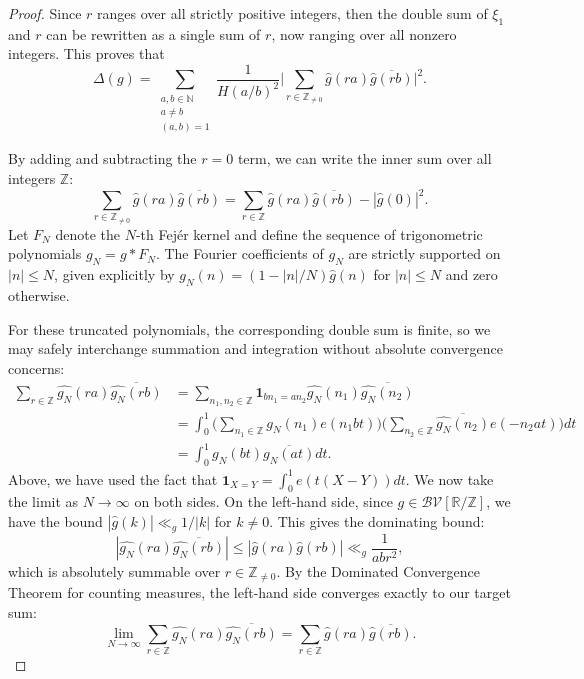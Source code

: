\documentclass[12pt]{amsart}
\renewcommand{\le}{\leqslant}
\numberwithin{equation}{section}
\theoremstyle{plain}
\theoremstyle{definition}
\newcommand{\N}{\mathbb{N}}
\newcommand{\Z}{\mathbb{Z}}
\newcommand{\R}{\mathbb{R}}
\newcommand{\CB}{\mathcal{B}}
\newcommand{\CV}{\mathcal{V}}
\begin{document}
\begin{proof}
	Since $r$ ranges over all strictly positive integers, then the double sum of $\xi_1$ and $r$ can be rewritten as a single sum of $r$, now ranging over all nonzero integers. This proves that 
	$$\Delta(g) = \sum_{\substack{a,b \in \N \\ a \ne b \\ (a,b) = 1}}\frac{1}{H(a/b)^2} \bigg|\sum_{r \in \Z_{\ne 0}} \hat{g}(ra) \overline{\hat{g}(rb)}\bigg|^2.$$
	
	By adding and subtracting the $r=0$ term, we can write the inner sum over all integers $\Z$:
	$$\sum_{r \in \Z_{\ne 0}} \hat{g}(ra) \overline{\hat{g}(rb)} = \sum_{r \in \Z} \hat{g}(ra) \overline{\hat{g}(rb)} - |\hat{g}(0)|^2.$$
	 Let $F_N$ denote the $N$-th Fej\'er kernel and define the sequence of trigonometric polynomials $g_N = g * F_N$. The Fourier coefficients of $g_N$ are strictly supported on $|n| \le N$, given explicitly by $\widehat{g_N}(n) = (1 - |n|/N)\hat{g}(n)$ for $|n| \le N$ and zero otherwise. 
	
	For these truncated polynomials, the corresponding double sum is finite, so we may safely interchange summation and integration without absolute convergence concerns:
	\begin{align*}
		\sum_{r \in \Z} \widehat{g_N}(ra) \overline{\widehat{g_N}(rb)} &= \sum_{n_1,n_2 \in \Z} \bm{1}_{bn_1 = an_2} \widehat{g_N}(n_1) \overline{\widehat{g_N}(n_2)} \\
		&= \int_0^1 \bigg(\sum_{n_1 \in \Z} \widehat{g_N}(n_1)e(n_1bt)\bigg)\bigg(\sum_{n_2 \in \Z} \overline{\widehat{g_N}(n_2)}e(-n_2at)\bigg)dt \\
		&= \int_0^1 g_N(bt)\overline{g_N(at)}dt.
	\end{align*}
	Above, we have used the fact that $\bm{1}_{X = Y} = \int_0^1 e(t(X-Y))dt$. We now take the limit as $N \to \infty$ on both sides. On the left-hand side, since $g \in \CB\CV[\R/\Z]$, we have the bound $|\hat{g}(k)| \ll_g 1/|k|$ for $k \ne 0$. This gives the dominating bound:
	$$|\widehat{g_N}(ra) \overline{\widehat{g_N}(rb)}| \le |\hat{g}(ra)\hat{g}(rb)| \ll_g \frac{1}{ab r^2},$$
	which is absolutely summable over $r \in \Z_{\ne 0}$. By the Dominated Convergence Theorem for counting measures, the left-hand side converges exactly to our target sum:
	$$\lim_{N \to \infty} \sum_{r \in \Z} \widehat{g_N}(ra) \overline{\widehat{g_N}(rb)} = \sum_{r \in \Z} \hat{g}(ra) \overline{\hat{g}(rb)}.$$
	

\end{proof}
\end{document}

